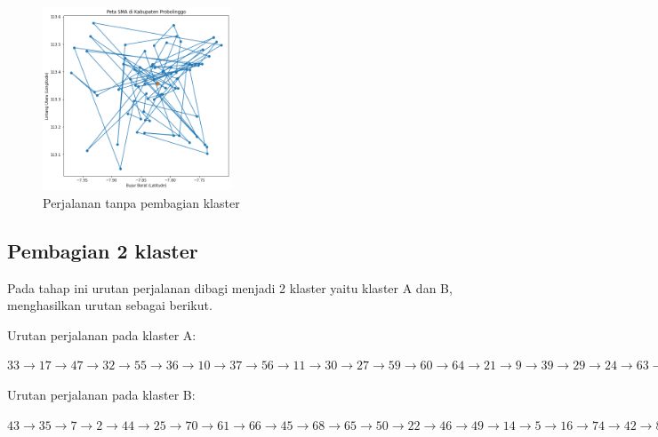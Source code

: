 \begin{figure}[H]
\centering
\includegraphics[width=0.5\textwidth]{Gambar/hasil_mtsp/1}
\caption{Perjalanan tanpa pembagian klaster}
\label{fig:hasil_mtsp1}
\end{figure}

\subsection{Pembagian 2 klaster}

Pada tahap ini urutan perjalanan dibagi menjadi 2 klaster yaitu klaster A dan B, menghasilkan urutan sebagai berikut.

\vspace{0.4cm}
\noindent Urutan perjalanan pada klaster A:

\noindent $
33 \rightarrow 17 \rightarrow 47 \rightarrow 32 \rightarrow 55 \rightarrow 36 \rightarrow 10 \rightarrow 37 \rightarrow 56 \rightarrow 11 \rightarrow 30 \rightarrow 27 \rightarrow 59 \rightarrow 60 \rightarrow 64 \rightarrow 21 \rightarrow 9 \rightarrow 39 \rightarrow 29 \rightarrow 24 \rightarrow 63 \rightarrow 72 \rightarrow 13 \rightarrow 6 \rightarrow 38 \rightarrow 52
$

\vspace{0.4cm}
\noindent Urutan perjalanan pada klaster B:

\noindent $
43 \rightarrow 35 \rightarrow 7 \rightarrow 2 \rightarrow 44 \rightarrow 25 \rightarrow 70 \rightarrow 61 \rightarrow 66 \rightarrow 45 \rightarrow 68 \rightarrow 65 \rightarrow 50 \rightarrow 22 \rightarrow 46 \rightarrow 49 \rightarrow 14 \rightarrow 5 \rightarrow 16 \rightarrow 74 \rightarrow 42 \rightarrow 8 \rightarrow 48 \rightarrow 31 \rightarrow 26 \rightarrow 18 \rightarrow 54 \rightarrow 40 \rightarrow 58 \rightarrow 67 \rightarrow 15 \rightarrow 12 \rightarrow 57 \rightarrow 20 \rightarrow 34 \rightarrow 69 \rightarrow 75 \rightarrow 41 \rightarrow 23 \rightarrow 51 \rightarrow 19 \rightarrow 28 \rightarrow 1 \rightarrow 62 \rightarrow 4 \rightarrow 53 \rightarrow 3 \rightarrow 71 \rightarrow 73
$
\vspace{0.4cm}

